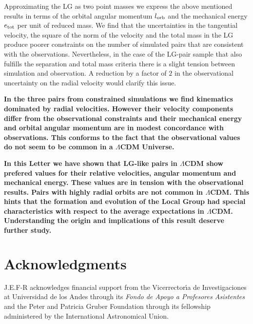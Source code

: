 \documentclass{emulateapj}
\begin{document}
Approximating the LG as two point masses we express the above mentioned results in terms of the orbital angular momentum $l_{\rm orb}$ and the mechanical energy $e_{\rm tot}$ per unit of reduced mass. We find that the uncertainties in the tangential velocity, the square of the norm of the velocity and the total mass in the LG produce poorer constraints on the number of simulated pairs that are consistent with the observations. Nevertheless, in the case of the LG-pair sample that also fulfills the separation and total mass criteria there is a slight tension between simulation and observation. A reduction by a factor of $2$ in the observational uncertainty on the radial velocity would clarify this issue.

{\bf In the three pairs from constrained simulations we find kinematics dominated by radial velocities. However their velocity components differ from the observational constraints and their mechanical energy and orbital angular momentum are in modest concordance with observations. This conforms to the fact that the observational values do not seem to be common in a $\Lambda$CDM Universe.}

{\bf In this Letter we have shown that LG-like pairs in $\Lambda$CDM show prefered values for their relative velocities, angular momentum and mechanical energy. These values are in tension with the observational results. Pairs with highly radial orbits are not common in $\Lambda$CDM. This hints that the formation and evolution of the Local Group had special characteristics with respect to the average expectations in $\Lambda$CDM. Understanding the origin and implications of this result deserve further study.}



\label{sec:conclusions}
\section*{Acknowledgments}  
J.E.F-R acknowledges financial support from the Vicerrector\'{\i}a de Investigaciones at Universidad de los Andes through its {\it Fondo de Apoyo a Profesores Asistentes} and the Peter and Patricia Gruber Foundation through its fellowship administered by the International Astronomical Union.



 
\end{document}
